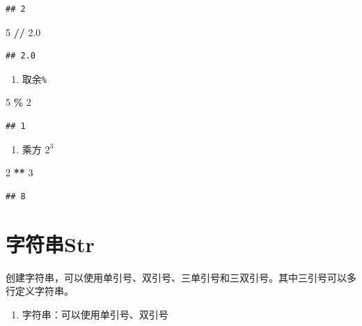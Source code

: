 \documentclass[
]{book}
\newenvironment{Shaded}{\begin{snugshade}}{\end{snugshade}}
\newcommand{\DecValTok}[1]{\textcolor[rgb]{0.00,0.00,0.81}{#1}}
\newcommand{\FloatTok}[1]{\textcolor[rgb]{0.00,0.00,0.81}{#1}}
\newcommand{\OperatorTok}[1]{\textcolor[rgb]{0.81,0.36,0.00}{\textbf{#1}}}
\providecommand{\tightlist}{%
  \setlength{\itemsep}{0pt}\setlength{\parskip}{0pt}}
\begin{document}
\begin{verbatim}
## 2
\end{verbatim}

\begin{Shaded}
\begin{Highlighting}[]
\DecValTok{5} \OperatorTok{//} \FloatTok{2.0}
\end{Highlighting}
\end{Shaded}

\begin{verbatim}
## 2.0
\end{verbatim}

\begin{enumerate}
\def\labelenumi{\arabic{enumi}.}
\setcounter{enumi}{2}
\tightlist
\item
  取余\texttt{\%}
\end{enumerate}

\begin{Shaded}
\begin{Highlighting}[]
\DecValTok{5} \OperatorTok{\%} \DecValTok{2}
\end{Highlighting}
\end{Shaded}

\begin{verbatim}
## 1
\end{verbatim}

\begin{enumerate}
\def\labelenumi{\arabic{enumi}.}
\setcounter{enumi}{3}
\tightlist
\item
  乘方 \(2^3\)
\end{enumerate}

\begin{Shaded}
\begin{Highlighting}[]
\DecValTok{2} \OperatorTok{**} \DecValTok{3}
\end{Highlighting}
\end{Shaded}

\begin{verbatim}
## 8
\end{verbatim}

\hypertarget{ux5b57ux7b26ux4e32str}{%
\section{字符串Str}\label{ux5b57ux7b26ux4e32str}}

创建字符串，可以使用单引号、双引号、三单引号和三双引号。其中三引号可以多行定义字符串。

\begin{enumerate}
\def\labelenumi{\arabic{enumi}.}
\tightlist
\item
  字符串：可以使用单引号、双引号
\end{enumerate}
\end{document}
